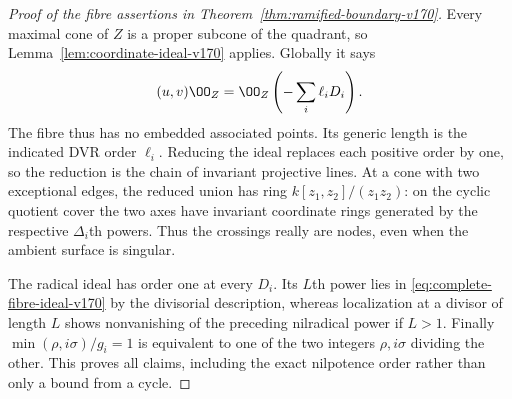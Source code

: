 \begin{proof}[Proof of the fibre assertions in Theorem~\ref{thm:ramified-boundary-v170}]
Every maximal cone of $Z$ is a proper subcone of the quadrant, so
Lemma~\ref{lem:coordinate-ideal-v170} applies. Globally it says
\begin{equation}\label{eq:complete-fibre-ideal-v170}
 (u,v)\OO_Z=\OO_Z\left(-\sum_i\ell_iD_i\right).
\end{equation}
The fibre thus has no embedded associated points. Its generic length
is the indicated DVR order $\ell_i$. Reducing the ideal replaces
each positive order by one, so the reduction is the chain of
invariant projective lines. At a cone with two exceptional edges,
the reduced union has ring $k[z_1,z_2]/(z_1z_2)$: on the cyclic
quotient cover the two axes have invariant coordinate rings generated
by the respective $\Delta_i$th powers. Thus the crossings really
are nodes, even when the ambient surface is singular.

The radical ideal has order one at every $D_i$. Its $L$th power lies
in \eqref{eq:complete-fibre-ideal-v170} by the divisorial description,
whereas localization at a divisor of length $L$ shows nonvanishing
of the preceding nilradical power if $L>1$. Finally
$\min(\rho,i\sigma)/g_i=1$ is equivalent to one of the two integers
$\rho,i\sigma$ dividing the other. This proves all claims, including
the exact nilpotence order rather than only a bound from a cycle.
\end{proof}

